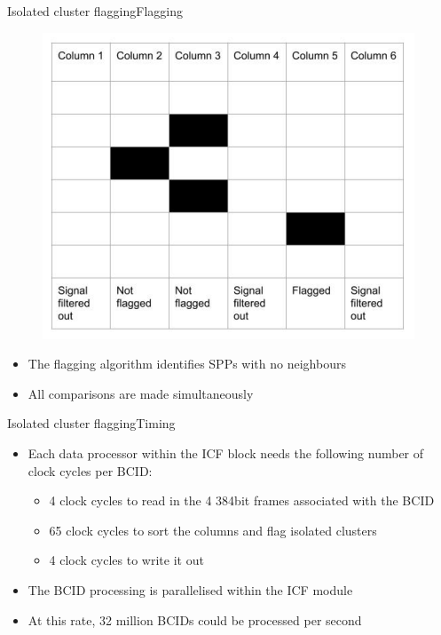 \documentclass{beamer}
\begin{document}
\begin{frame}{Isolated cluster flagging}{Flagging}
  \begin{figure}
    \begin{center}
      \includegraphics[height=0.5\textheight]{figs/Columns}
    \end{center}
    \vspace*{-0.5cm}
  \end{figure}
  \begin{itemize}
    \item
      The flagging algorithm identifies SPPs with no neighbours
    \item
      All comparisons are made simultaneously
  \end{itemize}
\end{frame}

\begin{frame}{Isolated cluster flagging}{Timing}
  \begin{itemize}
    \item
      Each data processor within the ICF block needs the following number of clock cycles per BCID:
      \begin{itemize}
        \item
          4 clock cycles to read in the 4 384bit frames associated with the BCID
        \item
          65 clock cycles to sort the columns and flag isolated clusters
        \item
          4 clock cycles to write it out
      \end{itemize}
    \item
      The BCID processing is parallelised within the ICF module
    \item
      At this rate, 32 million BCIDs could be processed per second
  \end{itemize}
\end{frame}
\end{document}
